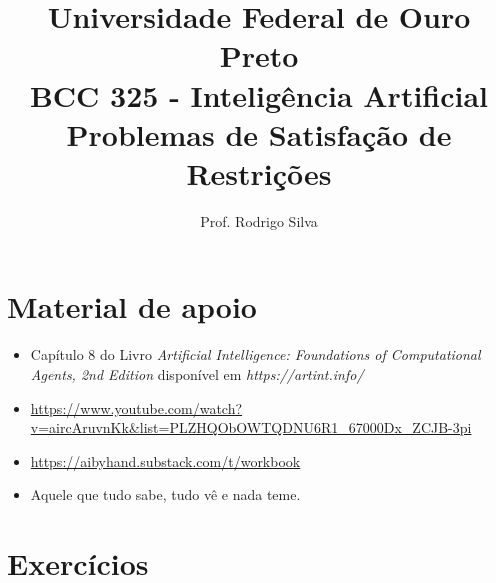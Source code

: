 \documentclass{article}
\title{\vspace{-2 cm}Universidade Federal de Ouro Preto \\ BCC 325 - Inteligência Artificial \\ Problemas de Satisfação de Restrições}
\author{Prof. Rodrigo Silva}
\date{}
\begin{document}
\maketitle

\section{Material de apoio}

\begin{itemize}
    \item Capítulo 8 do Livro\textit{ Artificial Intelligence: Foundations of Computational Agents,  2nd Edition} disponível em \textit{https://artint.info/}
    \item \url{https://www.youtube.com/watch?v=aircAruvnKk&list=PLZHQObOWTQDNU6R1_67000Dx_ZCJB-3pi}
    \item \url{https://aibyhand.substack.com/t/workbook}
    \item Aquele que tudo sabe, tudo vê e nada teme.
\end{itemize}

\section{Exercícios}
\end{document}
